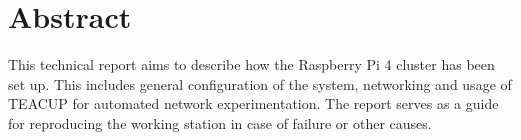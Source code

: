 \chapter*{Abstract}

This technical report aims to describe how the Raspberry Pi 4 cluster has been set up. This includes general configuration of the system, networking and usage of TEACUP for automated network experimentation. The report serves as a guide for reproducing the working station in case of failure or other causes.